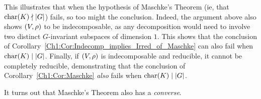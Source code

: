 \begin{boxnexample}
\begin{enumerate}
    \end{enumerate}
    This illustrates that when the hypothesis of Maschke's Theorem (ie, that $\operatorname{char}\!\left( K \right) \nmid \left\lvert G \right\rvert$) fails, so too might the conclusion. Indeed, the argument above also shows $\left( V, \rho \right)$ to be indecomposable, as any decomposition would need to involve two distinct $G$-invariant subspaces of dimension $1$. This shows that the conclusion of Corollary~\ref{Ch1:Cor:Indecomp_implies_Irred_of_Maschke} can also fail when $\operatorname{char}\!\left( K \right) \mid \left\lvert G \right\rvert$. Finally, if $\left( V, \rho \right)$ is indecomposable and reducible, it cannot be completely reducible, demonstrating that the conclusion of Corollary~\ref{Ch1:Cor:Maschke} \textit{also} fails when $\operatorname{char}\!\left( K \right) \mid \left\lvert G \right\rvert$.
\end{boxnexample}

It turns out that Maschke's Theorem also has a \textit{converse}.

